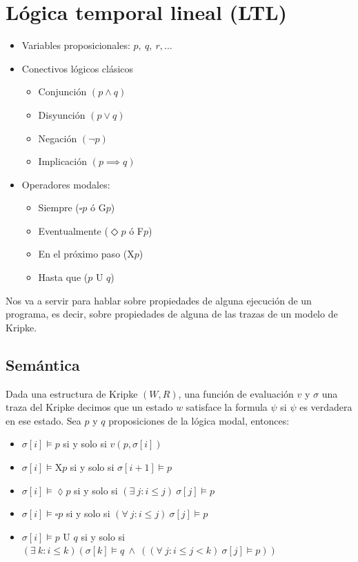 \newpage
\section{Lógica temporal lineal (LTL)}
\begin{itemize}
\item Variables proposicionales: $p,~q,~r,\dots$
\item Conectivos lógicos clásicos
\begin{multicols}{2}
\begin{itemize}
\item Conjunción $(p \land q)$
\item Disyunción $(p \lor q)$
\item Negación $(\lnot p)$
\item Implicación $(p \implies q)$
\end{itemize}
\end{multicols}
\item Operadores modales:
\begin{multicols}{2}
\begin{itemize}
\item Siempre ($\square p$ ó G$p$)
\item Eventualmente ($\Diamond p$ ó F$p$)
\item En el próximo paso (X$p$)
\item Hasta que ($p$ U $q$)
\end{itemize}
\end{multicols}
\end{itemize}

Nos va a servir para hablar sobre propiedades de alguna ejecución de un programa, es decir, sobre propiedades de alguna de las trazas de un modelo de Kripke.


\subsection{Semántica}
Dada una estructura de Kripke $(W,R)$, una función de evaluación $v$ y $\sigma$ una traza del Kripke decimos que un estado $w$ satisface la formula $\psi$ si $\psi$ es verdadera en ese estado. Sea $p$ y $q$ proposiciones de la lógica modal, entonces:
\begin{itemize}
    \item $\sigma[i] \vDash p$ si y solo si $v(p,\sigma[i])$
    \item $\sigma[i] \vDash \text{X}p$ si y solo si $\sigma[i+1]\vDash p$
    \item $\sigma[i] \vDash \lozenge p$ si y solo si $(\exists~j: i \leq j)~\sigma[j] \vDash p$
    \item $\sigma[i] \vDash \square p$  si y solo si $(\forall~j: i \leq j)~\sigma[j] \vDash p$
    \item $\sigma[i] \vDash p \text{ U } q$ si y solo si $(\exists~k: i \leq k) (\sigma[k] \vDash q ~\wedge~ ((\forall~j: i \leq j < k)~\sigma[j] \vDash p))$
\end{itemize}

